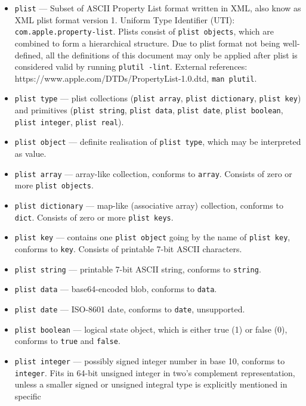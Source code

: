 \documentclass[]{article}
\begin{document}
\begin{itemize}
\item
  \texttt{plist} --- Subset of ASCII Property List format written in
  XML, also know as XML plist format version 1. Uniform Type Identifier
  (UTI): \texttt{com.apple.property-list}. Plists consist of
  \texttt{plist\ objects}, which are combined to form a hierarchical
  structure. Due to plist format not being well-defined, all the
  definitions of this document may only be applied after plist is
  considered valid by running \texttt{plutil\ -lint}. External
  references: https://www.apple.com/DTDs/PropertyList-1.0.dtd,
  \texttt{man\ plutil}.
\item
  \texttt{plist\ type} --- plist collections (\texttt{plist\ array},
  \texttt{plist\ dictionary}, \texttt{plist\ key}) and primitives
  (\texttt{plist\ string}, \texttt{plist\ data}, \texttt{plist\ date},
  \texttt{plist\ boolean}, \texttt{plist\ integer},
  \texttt{plist\ real}).
\item
  \texttt{plist\ object} --- definite realisation of
  \texttt{plist\ type}, which may be interpreted as value.
\item
  \texttt{plist\ array} --- array-like collection, conforms to
  \texttt{array}. Consists of zero or more \texttt{plist\ objects}.
\item
  \texttt{plist\ dictionary} --- map-like (associative array)
  collection, conforms to \texttt{dict}. Consists of zero or more
  \texttt{plist\ keys}.
\item
  \texttt{plist\ key} --- contains one \texttt{plist\ object} going by
  the name of \texttt{plist\ key}, conforms to \texttt{key}. Consists of
  printable 7-bit ASCII characters.
\item
  \texttt{plist\ string} --- printable 7-bit ASCII string, conforms to
  \texttt{string}.
\item
  \texttt{plist\ data} --- base64-encoded blob, conforms to
  \texttt{data}.
\item
  \texttt{plist\ date} --- ISO-8601 date, conforms to \texttt{date},
  unsupported.
\item
  \texttt{plist\ boolean} --- logical state object, which is either true
  (1) or false (0), conforms to \texttt{true} and \texttt{false}.
\item
  \texttt{plist\ integer} --- possibly signed integer number in base 10,
  conforms to \texttt{integer}. Fits in 64-bit unsigned integer in two's
  complement representation, unless a smaller signed or unsigned
  integral type is explicitly mentioned in specific

\end{itemize}
\end{document}

